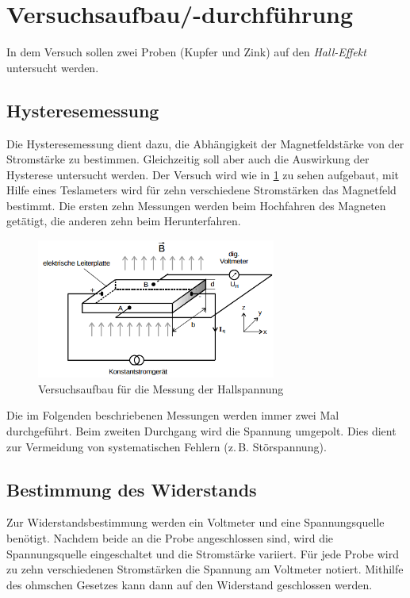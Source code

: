 \section{Versuchsaufbau/-durchführung}
In dem Versuch sollen zwei Proben (Kupfer und Zink) auf den \emph{Hall-Effekt} untersucht werden. %

\subsection{Hysteresemessung}
Die Hysteresemessung dient dazu, die Abhängigkeit der Magnetfeldstärke
von der Stromstärke zu bestimmen.
Gleichzeitig soll aber auch die Auswirkung der Hysterese untersucht werden.
 Der Versuch wird wie in \ref{fig: auf_hall} zu sehen aufgebaut, %
mit Hilfe eines Teslameters wird für zehn verschiedene Stromstärken das Magnetfeld bestimmt. %
Die ersten zehn Messungen werden beim Hochfahren des Magneten getätigt, %
die anderen zehn beim Herunterfahren.

\begin{figure}
  \centering
  \includegraphics[width=0.7\textwidth]{pics/Halleffekt_aufbau.png}
  \caption{Versuchsaufbau für die Messung der Hallspannung}
  \label{fig: auf_hall}
\end{figure}

\begin{center}
Die im Folgenden beschriebenen Messungen werden immer zwei Mal durchgeführt. %
Beim zweiten Durchgang wird die Spannung umgepolt. %
Dies dient zur Vermeidung von systematischen Fehlern (z.\,B. Störspannung). %
\end{center}

\subsection{Bestimmung des Widerstands}
Zur Widerstandsbestimmung werden ein Voltmeter und
eine Spannungsquelle benötigt.
Nachdem beide an die Probe angeschlossen sind,
wird die Spannungsquelle eingeschaltet und die Stromstärke variiert.
Für jede Probe wird zu zehn verschiedenen Stromstärken
die Spannung am Voltmeter notiert.
Mithilfe des ohmschen Gesetzes kann dann auf den Widerstand geschlossen werden.

